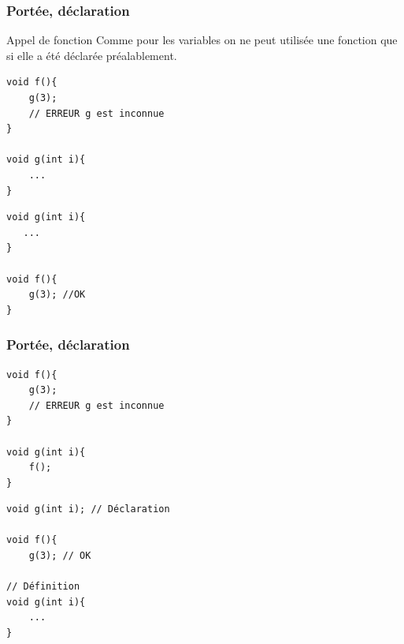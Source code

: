\begin{frame}[fragile]
	\frametitle{Portée, déclaration}

	\begin{block}{Appel de fonction}
		Comme pour les variables on ne peut utilisée une fonction que si elle a été déclarée préalablement.
	\end{block}
	\vfill

	\begin{minipage}{0.47\linewidth}

	\begin{verbatim}
void f(){
    g(3);
    // ERREUR g est inconnue
}

void g(int i){
    ...
}
	\end{verbatim}
	\end{minipage}
	\hfill
	\begin{minipage}{0.47\linewidth}
	\begin{verbatim}
void g(int i){
   ...
}

void f(){
    g(3); //OK
}
	\end{verbatim}
	\end{minipage}
\end{frame}

\begin{frame}[fragile]
	\frametitle{Portée, déclaration}

	\begin{minipage}{0.47\linewidth}
		\begin{verbatim}
void f(){
    g(3);
    // ERREUR g est inconnue
}

void g(int i){
    f();
}
		\end{verbatim}
	\end{minipage}
	\hfill
	\begin{minipage}{0.47\linewidth}

		\begin{verbatim}
void g(int i); // Déclaration

void f(){
    g(3); // OK

// Définition
void g(int i){
    ...
}
		\end{verbatim}
	\end{minipage}
\end{frame}

